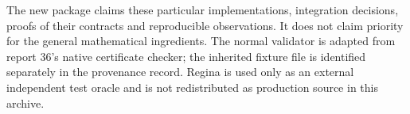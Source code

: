 The new package claims these particular implementations, integration
decisions, proofs of their contracts and reproducible observations. It
does not claim priority for the general mathematical ingredients. The
normal validator is adapted from report 36's native certificate checker;
the inherited fixture file is identified separately in the provenance
record. Regina is used only as an external independent test oracle and is
not redistributed as production source in this archive.
